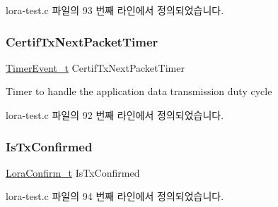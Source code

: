 lora-\/test.\+c 파일의 93 번째 라인에서 정의되었습니다.

\mbox{\label{lora-test_8c_a0c9bb346324d81b31bd460c40b151cdd}} 
\subsubsection{\texorpdfstring{Certif\+Tx\+Next\+Packet\+Timer}{CertifTxNextPacketTimer}}
{\footnotesize\ttfamily \mbox{\hyperlink{time_server_8h_ae706369dabb8aa6c6075f25119b052a5}{Timer\+Event\+\_\+t}} Certif\+Tx\+Next\+Packet\+Timer\hspace{0.3cm}{\ttfamily [static]}}

Timer to handle the application data transmission duty cycle 

lora-\/test.\+c 파일의 92 번째 라인에서 정의되었습니다.

\mbox{\label{lora-test_8c_aeeb75e9eb8da494fe7cbf16abf51427a}} 
\subsubsection{\texorpdfstring{Is\+Tx\+Confirmed}{IsTxConfirmed}}
{\footnotesize\ttfamily \mbox{\hyperlink{lora_8h_abb50b325793cb04a67bdef9c8c198c20}{Lora\+Confirm\+\_\+t}} Is\+Tx\+Confirmed\hspace{0.3cm}{\ttfamily [static]}}



lora-\/test.\+c 파일의 94 번째 라인에서 정의되었습니다.


